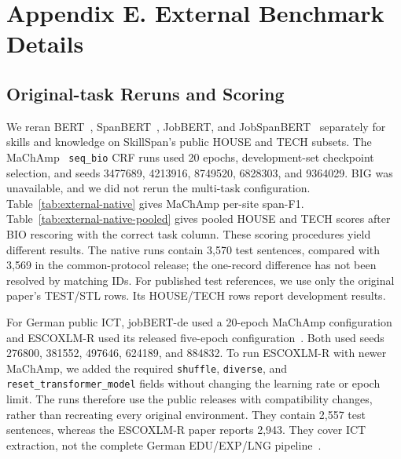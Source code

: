 \FloatBarrier
\section{Appendix E. External Benchmark Details}
\label{app:e}
\subsection{Original-task Reruns and Scoring}
We reran BERT~\citep{devlin2019bert}, SpanBERT~\citep{joshi2020spanbert}, JobBERT, and JobSpanBERT~\citep{zhang2022skillspan} separately for skills and knowledge on SkillSpan's public HOUSE and TECH subsets. The MaChAmp~\citep{vandergoot2021machamp} \texttt{seq\_bio} CRF runs used 20 epochs, development-set checkpoint selection, and seeds 3477689, 4213916, 8749520, 6828303, and 9364029. BIG was unavailable, and we did not rerun the multi-task configuration. Table~\ref{tab:external-native} gives MaChAmp per-site span-F1. Table~\ref{tab:external-native-pooled} gives pooled HOUSE and TECH scores after BIO rescoring with the correct task column. These scoring procedures yield different results. The native runs contain 3,570 test sentences, compared with 3,569 in the common-protocol release; the one-record difference has not been resolved by matching IDs. For published test references, we use only the original paper's TEST/STL rows. Its HOUSE/TECH rows report development results.

For German public ICT, jobBERT-de used a 20-epoch MaChAmp configuration and ESCOXLM-R used its released five-epoch configuration~\citep{zhang2023escoxlmr}. Both used seeds 276800, 381552, 497646, 624189, and 884832. To run ESCOXLM-R with newer MaChAmp, we added the required \texttt{shuffle}, \texttt{diverse}, and \texttt{reset\_transformer\_model} fields without changing the learning rate or epoch limit. The runs therefore use the public releases with compatibility changes, rather than recreating every original environment. They contain 2,557 test sentences, whereas the ESCOXLM-R paper reports 2,943. They cover ICT extraction, not the complete German EDU/EXP/LNG pipeline~\citep{gnehm2022skills}.

